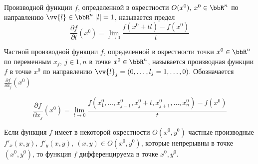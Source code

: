 \begin{defn}
Производной функции $f$, определенной в окрестности $O(x^0), \: x^0 \in \bbR^n$ по направлению $\vv{l} \in \bbR^n \; |l| = 1$, называется предел
$$
\frac{\partial f}{\partial l}(x^0) = \lim\limits_{t \to 0} \frac{f(x^0 + tl) - f(x^0)}{t}
$$
\end{defn}

\begin{defn}
Частной производной функции $f$, определенной в окрестности точки $x^0 \in \bbR^n$ по переменным $x_j, \: j \in \overline{1,n}$ в точке $x^0 \in \bbR^n$, называется производная функции $f$ в точке $x^0$ по направлению $\vv{l}_j = (0, \ldots, l_j = 1, \ldots, 0)$. Обозначается $\frac{\partial f}{\partial x_j}(x^0)$

$$
\frac{\partial f}{\partial x_j}(x^0) = \lim\limits_{t \to 0} \frac{f(x^0_1, \ldots, x^0_{j - 1}, x^0_j + t, x^0_{j + 1}, \ldots, x^0_n) - f(x^0)}{t}  
$$
\end{defn}


\begin{thm} \label{ch8th1}
Если функция $f$ имеет в некоторой окрестности $O(x^0, y^0)$ частные производные $f'_x(x,y), \: f'_y(x,y), \: (x,y) \in O(x^0, y^0)$, которые непрерывны в точке $(x^0, y^0)$, то функция $f$ дифференцируема в точке $x^0, y^0$.
\end{thm}


